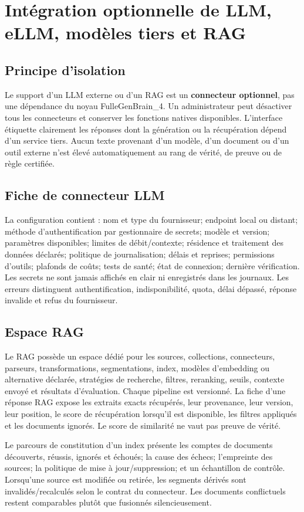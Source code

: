 \documentclass[11pt,a4paper]{article}
\begin{document}
\section{Intégration optionnelle de LLM, eLLM, modèles tiers et RAG}
\subsection{Principe d'isolation}
Le support d'un LLM externe ou d'un RAG est un \textbf{connecteur optionnel}, pas une dépendance du noyau FulleGenBrain\_4. Un administrateur peut désactiver tous les connecteurs et conserver les fonctions natives disponibles. L'interface étiquette clairement les réponses dont la génération ou la récupération dépend d'un service tiers. Aucun texte provenant d'un modèle, d'un document ou d'un outil externe n'est élevé automatiquement au rang de vérité, de preuve ou de règle certifiée.

\subsection{Fiche de connecteur LLM}
La configuration contient : nom et type du fournisseur; endpoint local ou distant; méthode d'authentification par gestionnaire de secrets; modèle et version; paramètres disponibles; limites de débit/contexte; résidence et traitement des données déclarés; politique de journalisation; délais et reprises; permissions d'outils; plafonds de coûts; tests de santé; état de connexion; dernière vérification. Les secrets ne sont jamais affichés en clair ni enregistrés dans les journaux. Les erreurs distinguent authentification, indisponibilité, quota, délai dépassé, réponse invalide et refus du fournisseur.

\subsection{Espace RAG}
Le RAG possède un espace dédié pour les sources, collections, connecteurs, parseurs, transformations, segmentations, index, modèles d'embedding ou alternative déclarée, stratégies de recherche, filtres, reranking, seuils, contexte envoyé et résultats d'évaluation. Chaque pipeline est versionné. La fiche d'une réponse RAG expose les extraits exacts récupérés, leur provenance, leur version, leur position, le score de récupération lorsqu'il est disponible, les filtres appliqués et les documents ignorés. Le score de similarité ne vaut pas preuve de vérité.

Le parcours de constitution d'un index présente les comptes de documents découverts, réussis, ignorés et échoués; la cause des échecs; l'empreinte des sources; la politique de mise à jour/suppression; et un échantillon de contrôle. Lorsqu'une source est modifiée ou retirée, les segments dérivés sont invalidés/recalculés selon le contrat du connecteur. Les documents conflictuels restent comparables plutôt que fusionnés silencieusement.
\end{document}
